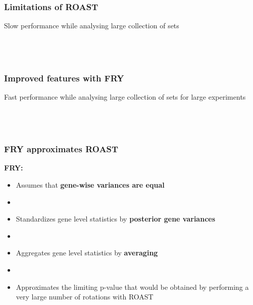 \documentclass[9pt,t]{beamer}
\begin{document}
\begin{frame}
\frametitle{Limitations of {\ttfamily ROAST}}
Slow performance while analysing large collection of sets\\
\vfill
 \\
\vfill
{}\\
\vfill
{}\\
\vfill
{}
\end{frame}

\begin{frame}
\frametitle{Improved features with {\ttfamily FRY}}
Fast performance while analysing large collection of sets for large experiments\\
\vfill
{}\\
\vfill
{}\\
\vfill
{}\\
\vfill
{}
\end{frame}

\begin{frame}
\frametitle{{\ttfamily FRY} approximates {\ttfamily ROAST}}
\vspace{1cm}
{\ttfamily \textbf{\color{oxygenpurple}FRY:}}
\vspace{0.3cm}
\begin{itemize}
\item Assumes that \textbf{\color{oxygenpurple}gene-wise variances are equal}
\item[]
\item Standardizes gene level statistics by \textbf{\color{oxygenpurple}posterior gene variances}
\item[] 
\item Aggregates gene level statistics by \textbf{\color{oxygenpurple}averaging}
\item[]
\item Approximates the limiting p-value that would be obtained by performing a very large number of rotations with {\ttfamily ROAST}
\end{itemize}
\end{frame}
\end{document}
